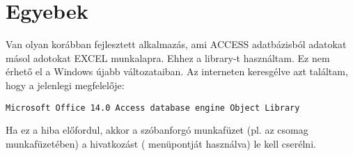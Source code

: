 \section{Egyebek}\label{sec:9.2}

Van olyan korábban fejlesztett alkalmazás, ami ACCESS adatbázisból
adatokat másol adotokat EXCEL munkalapra. Ehhez a 
library-t használtam. Ez nem érhető el a Windows újabb 
változataiban. Az interneten keresgélve azt találtam, hogy a jelenlegi
megfelelője: 
\begin{verbatim}
Microsoft Office 14.0 Access database engine Object Library
\end{verbatim}
Ha ez a hiba előfordul, akkor a szóbanforgó munkafüzet (pl. az 
csomag   
munkafüzetében) a hivatkozást ( menüpontját
használva) le kell cserélni. 

